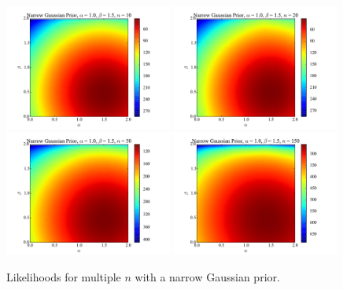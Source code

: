\documentclass{article}
\theoremstyle{definition}
\begin{document}
\begin{figure}\centering
    \includegraphics[width=0.49\textwidth]{lh2d_9.pdf}
    \includegraphics[width=0.49\textwidth]{lh2d_10.pdf}
    \\
    \includegraphics[width=0.49\textwidth]{lh2d_11.pdf}
    \includegraphics[width=0.49\textwidth]{lh2d_12.pdf}
    \caption{\label{2d_narrowgauss}Likelihoods for multiple $n$ with
    a narrow Gaussian prior.}
\end{figure}
\end{document}
